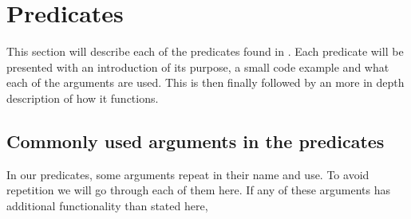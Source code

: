 \section{Predicates}
This section will describe each of the predicates found in \FW. Each predicate will be presented with an introduction of its purpose, a small code example and what each of the arguments are used. This is then finally followed by an more in depth description of how it functions.

\subsection{Commonly used arguments in the predicates}
In our predicates, some arguments repeat in their name and use. To avoid repetition we will go through each of them here. If any of these arguments has additional functionality than stated here, 









